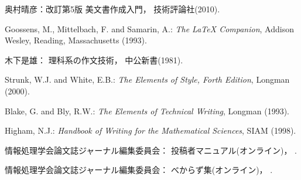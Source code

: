 \documentclass[submit]{ipsj}
\begin{document}



\begin{thebibliography}{99}
\bibitem


奥村晴彦：改訂第5版 \LaTeXe 美文書作成入門，
技術評論社(2010).

Goossens, M., Mittelbach, F. and Samarin, A.: {\it The LaTeX Companion},
Addison Wesley, Reading, Massachusetts (1993).

木下是雄：
理科系の作文技術，
中公新書(1981).

Strunk, W.J. and White, E.B.: {\it The Elements of Style, Forth Edition},
Longman (2000).

Blake, G. and Bly, R.W.: {\it The Elements of Technical Writing},
Longman (1993).

Higham, N.J.:
{\it Handbook of Writing for the Mathematical Sciences},
SIAM (1998).

情報処理学会論文誌ジャーナル編集委員会：
投稿者マニュアル(オンライン)，
%
.

情報処理学会論文誌ジャーナル編集委員会：
べからず集(オンライン)，
%
.

\end{thebibliography}
\end{document}

